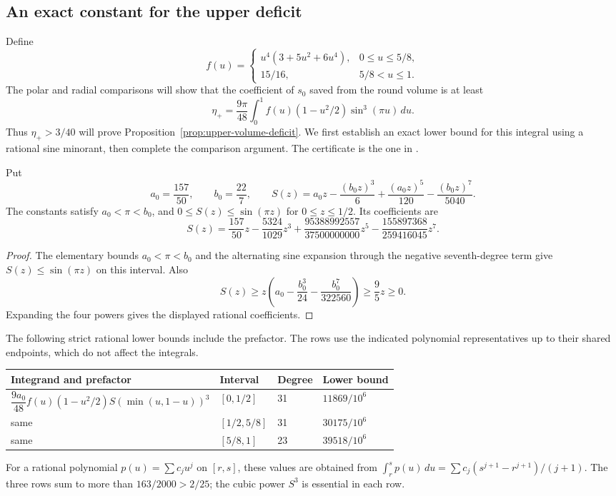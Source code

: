 \subsection{An exact constant for the upper deficit}

Define
\[
 f(u)=\begin{cases}
 u^4(3+5u^2+6u^4),&0\le u\le5/8,\\
 15/16,&5/8<u\le1.
 \end{cases}
\]
The polar and radial comparisons will show that the coefficient of
$s_0$ saved from the round volume is at least
\[
 \eta_+=\frac{9\pi}{48}\int_0^1
 f(u)(1-u^2/2)\sin^3(\pi u)\,du.
\]
Thus $\eta_+>3/40$ will prove Proposition~\ref{prop:upper-volume-deficit}.
We first establish an exact lower bound for this integral using a rational
sine minorant, then complete the comparison argument. The certificate is
the one in \cite[Section~4]{OpenAI2026P}.

\begin{lemma}\label{lem:sine-minorant}
Put
\[
 a_0=\frac{157}{50},\qquad b_0=\frac{22}{7},\qquad
 S(z)=a_0z-\frac{(b_0z)^3}{6}
          +\frac{(a_0z)^5}{120}-\frac{(b_0z)^7}{5040}.
\]
The constants satisfy $a_0<\pi<b_0$, and
$0\le S(z)\le\sin(\pi z)$ for $0\le z\le1/2$. Its coefficients are
\[
 S(z)=\frac{157}{50}z-\frac{5324}{1029}z^3
       +\frac{95388992557}{37500000000}z^5
       -\frac{155897368}{259416045}z^7.
\]
\end{lemma}
\begin{proof}
The elementary bounds $a_0<\pi<b_0$ and the alternating sine expansion
through the negative seventh-degree term give $S(z)\le\sin(\pi z)$ on
this interval. Also
\[
 S(z)\ge z\left(a_0-\frac{b_0^3}{24}
                       -\frac{b_0^7}{322560}\right)\ge\frac95z\ge0.
\]
Expanding the four powers gives the displayed rational coefficients.
\end{proof}

The following strict rational lower bounds include the prefactor. The
rows use the indicated polynomial representatives up to their shared
endpoints, which do not affect the integrals.
\begin{center}
\begin{tabular}{@{}llll@{}}
\toprule
Integrand and prefactor & Interval & Degree & Lower bound\\
\midrule
$\dfrac{9a_0}{48}f(u)(1-u^2/2)S(\min(u,1-u))^3$
 &$[0,1/2]$&31&$11869/10^6$\\
same &$[1/2,5/8]$&31&$30175/10^6$\\
same &$[5/8,1]$&23&$39518/10^6$\\
\bottomrule
\end{tabular}
\end{center}
For a rational polynomial $p(u)=\sum c_ju^j$ on $[r,s]$, these values
are obtained from
$\int_r^s p(u)\,du=\sum c_j(s^{j+1}-r^{j+1})/(j+1)$.
The three rows sum to more than $163/2000>2/25$; the cubic power $S^3$
is essential in each row.


